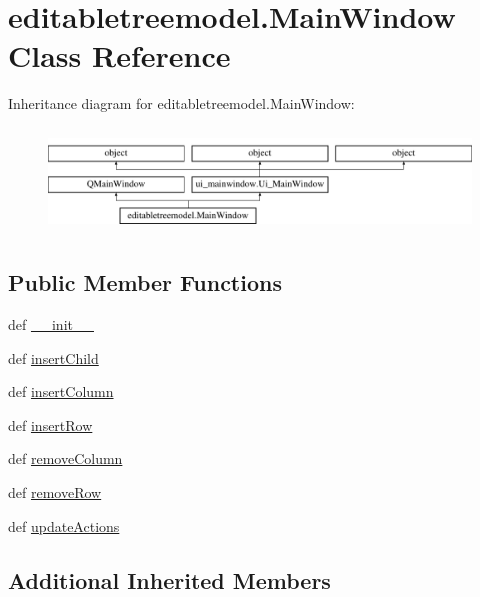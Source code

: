\hypertarget{classeditabletreemodel_1_1MainWindow}{}\section{editabletreemodel.\+Main\+Window Class Reference}
\label{classeditabletreemodel_1_1MainWindow}
Inheritance diagram for editabletreemodel.\+Main\+Window\+:\begin{figure}[H]
\begin{center}
\leavevmode
\includegraphics[height=2.814070cm]{classeditabletreemodel_1_1MainWindow}
\end{center}
\end{figure}
\subsection*{Public Member Functions}
\begin{DoxyCompactItemize}
\item 
def \hyperlink{classeditabletreemodel_1_1MainWindow_a810ab8071bea328b22830a780f583c58}{\+\_\+\+\_\+init\+\_\+\+\_\+}
\item 
def \hyperlink{classeditabletreemodel_1_1MainWindow_a6ef70a61fac4cc2b7ad5e099faf1aa0c}{insert\+Child}
\item 
def \hyperlink{classeditabletreemodel_1_1MainWindow_af46f53bd9faba8d1a978cb9b6ddeebbb}{insert\+Column}
\item 
def \hyperlink{classeditabletreemodel_1_1MainWindow_ac125bf3c68b2e87f840ff6b56c750544}{insert\+Row}
\item 
def \hyperlink{classeditabletreemodel_1_1MainWindow_a57b64e955fc49a3cc84153735cd2d8da}{remove\+Column}
\item 
def \hyperlink{classeditabletreemodel_1_1MainWindow_ac6c913b6f8f75cd9776faf1d977db95e}{remove\+Row}
\item 
def \hyperlink{classeditabletreemodel_1_1MainWindow_a8045e1ca8b55d03a994f314acd9f069a}{update\+Actions}
\end{DoxyCompactItemize}
\subsection*{Additional Inherited Members}


